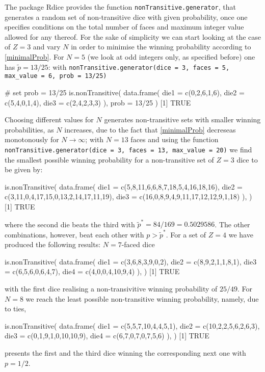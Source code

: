 \bigskip 
The package \texttt{}{Rdice} provides the function \texttt{nonTransitive.generator},
that generates a random set of non-transitive dice with given 
probability, once one specifies conditions on the total number of
faces and maximum integer value allowed for any thereof. For the sake 
of simplicity we can start looking at the case of $Z=3$ and 
vary $N$ in order to minimise the winning probability according 
to \eqref{minimalProb}. For $N=5$ (we look at odd integers only, as specified before)
one has $\tilde{p} = 13/25$: with \texttt{nonTransitive.generator(dice = 3, 
faces = 5, max\_value = 6, prob = 13/25)}

\begin{code}
# set prob = 13/25
is.nonTransitive(
	data.frame(
	die1 = c(0,2,6,1,6),
	die2 = c(5,4,0,1,4),
	die3 = c(2,4,2,3,3)
	), 
prob = 13/25
)	
[1] TRUE
\end{code}

Choosing different values for $N$ generates non-transitive sets with
smaller winning probabilities, as $N$ increases, due to the fact that 
\eqref{minimalProb} decreseas monotonously for $N\to\infty$; with $N=13$ faces 
and using the function 
\texttt{nonTransitive.generator(dice = 3, faces = 13, max\_value = 20)}
we find the smallest possible winning probability for a non-transitive 
set of $Z=3$ dice to be given by:
\begin{code}
is.nonTransitive(
	data.frame(
	die1 = c(5,8,11,6,6,8,7,18,5,4,16,18,16),
	die2 = c(3,11,0,4,17,15,0,13,2,14,17,11,19),
	die3 = c(16,0,8,9,4,9,11,17,12,12,9,1,18)
	),
)	
[1] TRUE
\end{code}
where the second die beats the third with $\tilde{p}^*=84/169 = 0.5029586$.
The other combinations, however, beat each other with $p>\tilde{p}^*$.
For a set of $Z=4$ we have produced the following results: $N=7$-faced
dice 
\begin{code}
is.nonTransitive(
	data.frame(
	die1 = c(3,6,8,3,9,0,2),
	die2 = c(8,9,2,1,1,8,1),
	die3 = c(6,5,6,0,6,4,7),
	die4 = c(4,0,0,4,10,9,4)
	),
)	
[1] TRUE
\end{code}
with the first dice realising a non-transivitive winning 
probability of $25/49$. For $N=8$ we reach the least possible
non-transitive winning probability, namely, due to ties,
\begin{code}
is.nonTransitive(
	data.frame(
	die1 = c(5,5,7,10,4,4,5,1),
	die2 = c(10,2,2,5,6,2,6,3),
	die3 = c(0,1,9,1,0,10,10,9),
	die4 = c(6,7,0,7,0,7,5,6)
	),
)
[1] TRUE
\end{code}
presents the first and the third dice winning the 
corresponding next one with $p=1/2$.
